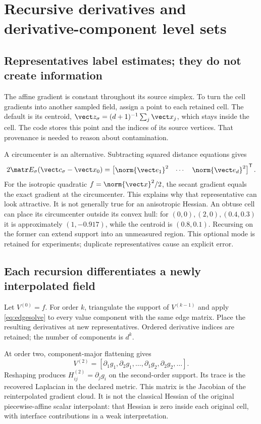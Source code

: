 \section{Recursive derivatives and derivative-component level sets}
\subsection{Representatives label estimates; they do not create information}
The affine gradient is constant throughout its source simplex. To turn the
cell gradients into another sampled field, assign a point to each retained
cell. The default is its centroid,
$\vect z_\sigma=(d+1)^{-1}\sum_j\vect x_j$, which stays inside the cell.
The code stores this point and the indices of its source vertices.
That provenance is needed to reason about contamination.

A circumcenter is an alternative. Subtracting squared distance equations gives
\begin{equation}
 2\matr E_\sigma(\vect c_\sigma-\vect x_0)
 =\begin{bmatrix}\norm{\vect e_1}^2&\cdots&\norm{\vect e_d}^2\end{bmatrix}^{\mathsf T}.
\end{equation}
For the isotropic quadratic $f=\norm{\vect x}^2/2$, the secant gradient equals
the exact gradient at the circumcenter. This explains why that representative
can look attractive. It is not generally true for an anisotropic Hessian.
An obtuse cell can place its circumcenter outside its convex hull: for
$(0,0),(2,0),(0.4,0.3)$ it is approximately $(1,-0.917)$, while the centroid is
$(0.8,0.1)$. Recursing on the former can extend support into an unmeasured
region. This optional mode is retained for experiments; duplicate
representatives cause an explicit error.

\subsection{Each recursion differentiates a newly interpolated field}
Let $V^{(0)}=f$. For order $k$, triangulate the support of $V^{(k-1)}$ and
apply \cref{eq:edgesolve} to every value component with the same edge matrix.
Place the resulting derivatives at new representatives. Ordered derivative
indices are retained; the number of components is $d^k$.

At order two, component-major flattening gives
\begin{equation}
 V^{(2)}=[\partial_1 g_1,\partial_2 g_1,\ldots,
          \partial_1 g_2,\partial_2 g_2,\ldots].
\end{equation}
Reshaping produces $H^{(2)}_{ij}=\partial_j g_i$ on the second-order support.
Its trace is the recovered Laplacian in the declared metric.
This matrix is the Jacobian of the reinterpolated gradient cloud. It is not
the classical Hessian of the original piecewise-affine scalar interpolant:
that Hessian is zero inside each original cell, with interface contributions
in a weak interpretation.

